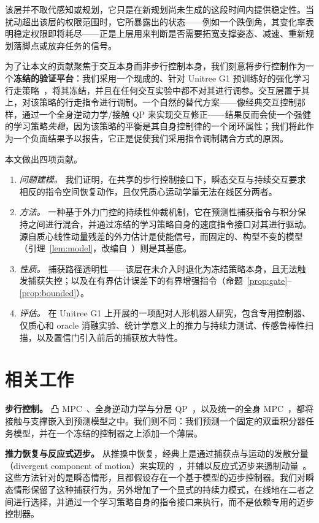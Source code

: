 \documentclass[journal]{IEEEtran}
\begin{document}
该层并不取代感知或规划，它只是在新规划尚未生成的这段时间内提供稳定性。当扰动超出该层的权限范围时，它所暴露出的状态——例如一个跌倒角，其变化率表明稳定权限即将耗尽——正是上层用来判断是否需要拓宽支撑姿态、减速、重新规划落脚点或放弃任务的信号。

为了让本文的贡献聚焦于交互本身而非步行控制本身，我们刻意将步行控制作为一个\textbf{冻结的验证平台}：我们采用一个现成的、针对 Unitree G1 预训练好的强化学习行走策略~\cite{r16}，将其冻结，并且在任何交互实验中都不对其进行调参。交互层置于其上，对该策略的行走指令进行调制。一个自然的替代方案——像经典交互控制那样，通过一个全身逆动力学/接触 QP 来实现交互修正——结果反而会使一个强健的学习策略\emph{失稳}，因为该策略的平衡是其自身控制律的一个闭环属性；我们将此作为一个负面结果予以报告，它正是促使我们采用指令调制耦合方式的原因。

本文做出四项贡献。
\begin{enumerate}
\item \emph{问题建模。} 我们证明，在共享的步行控制接口下，瞬态交互与持续交互要求相反的指令空间恢复动作，且仅凭质心运动学量无法在线区分两者。
\item \emph{方法。} 一种基于外力门控的持续性仲裁机制，它在预测性捕获指令与积分保持之间进行混合，并通过冻结的学习策略自身的速度指令接口对其进行驱动。源自质心线性动量残差的外力估计是使能信号，而固定的、构型不变的模型（引理~\ref{lem:model}，改编自~\cite{r1}）则是其基底。
\item \emph{性质。} 捕获路径透明性——该层在未介入时退化为冻结策略本身，且无法触发捕获失控；以及在有界估计误差下的有界增强指令（命题~\ref{prop:gate}–\ref{prop:bounded}）。
\item \emph{评估。} 在 Unitree G1 上开展的一项配对人形机器人研究，包含专用控制器、仅质心和 oracle 消融实验、统计学意义上的推力与持续力测试、传感鲁棒性扫描，以及置信门引入前后的捕获放大特性。
\end{enumerate}

\section{相关工作}
\label{sec:related}

\textbf{步行控制。} 凸 MPC~\cite{r2,r3,r13}、全身逆动力学与分层 QP~\cite{r4,r5,r7,r9}，以及统一的全身 MPC~\cite{r10}，都将接触与支撑嵌入到预测模型之中。我们则不同：我们预测一个固定的双重积分器任务模型，并在一个冻结的控制器之上添加一个薄层。

\textbf{推力恢复与反应式迈步。} 从推搡中恢复，经典上是通过捕获点与运动的发散分量（divergent component of motion）来实现的~\cite{r20,r21}，并辅以反应式迈步来遏制动量~\cite{r22}。这些方法针对的是瞬态情形，且都假设存在一个基于模型的迈步控制器。我们对瞬态情形保留了这种捕获行为，另外增加了一个显式的持续力模式，在线地在二者之间进行选择，并通过一个学习策略自身的指令接口来执行，而不是依赖专用的迈步控制器。
\end{document}
